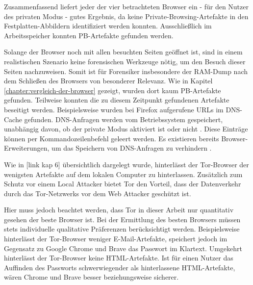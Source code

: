 \begin{comment}
Weiterführende Arbeiten:
> Cross-mode interference \cite{Hedberg.2013}:
	o	the Chrome://memory page displays all the opened tabs in the browser regardless if they are in the usual or private mode -> Nicht mehr aktuell -> Stattdessen: Chrome Task-manager (Ctrl + Esc), Funktioniert auch bei Firefox
> Unser Scope: Process Monitor nach Prozessnamen gefiltert
	- Weiterführend: Nach Pathnamen filtern: "Common Locations"

> Für wen wird Browser entwickelt
> Warum und für wen wird Private Browsing analysiert?
> Ist das Auffinden privater Browsing Artefakte Schuld von Browser Entwicklern? (Oder Schuld des Betriebssystem, wie in (TODO!) erwähnt)
\end{comment}

Zusammenfassend liefert jeder der vier betrachteten Browser ein - für den Nutzer des privaten Modus - gutes Ergebnis, da keine Private-Browsing-Artefakte in den Festplatten-Abbildern identifiziert werden konnten. 
Ausschließlich im Arbeitsspeicher konnten PB-Artefakte gefunden werden.

Solange der Browser noch mit allen besuchten Seiten geöffnet ist, sind in einem realistischen Szenario keine forensischen Werkzeuge nötig, um den Besuch dieser Seiten nachzuweisen. Somit ist für Forensiker insbesondere der RAM-Dump nach dem Schließen des Browsers von besonderer Relevanz. 
Wie in Kapitel \ref{chapter:vergleich-der-browser} gezeigt, wurden dort kaum PB-Artefakte gefunden.
Teilweise konnten die zu diesem Zeitpunkt gefundenen Artefakte beseitigt werden.
Beispielsweise wurden bei Firefox aufgerufene URLs im DNS-Cache gefunden. DNS-Anfragen werden vom Betriebssystem gespeichert, unabhängig davon, ob der private Modus aktiviert ist oder nicht \cite{Satvat.2014}. Diese Einträge können per Kommandozeilenbefehl geleert werden. Es existieren bereits Browser-Erweiterungen, um das Speichern von DNS-Anfragen zu verhindern \cite{Satvat.2014}.

Wie in [link kap 6] übersichtlich dargelegt wurde, hinterlässt der Tor-Browser der wenigsten Artefakte auf dem lokalen Computer zu hinterlassen. 
Zusätzlich zum Schutz vor einem Local Attacker bietet Tor den Vorteil, dass der Datenverkehr durch das Tor-Netzwerks vor dem Web Attacker geschützt ist. 

Hier muss jedoch beachtet werden, dass Tor in dieser Arbeit nur quantitativ gesehen der beste Browser ist.
Bei der Ermittlung des besten Browsers müssen stets individuelle qualitative Präferenzen berücksichtigt werden. 
Beispielsweise hinterlässt der Tor-Browser weniger E-Mail-Artefakte, speichert jedoch im Gegensatz zu Google Chrome und Brave das Passwort im Klartext. Umgekehrt hinterlässt der Tor-Browser keine HTML-Artefakte.
Ist für einen Nutzer das Auffinden des Passworts schwerwiegender als hinterlassene HTML-Artefakte, wären Chrome und Brave \glqq{}besser\grqq{} beziehungsweise \glqq{}sicherer\grqq{}.

